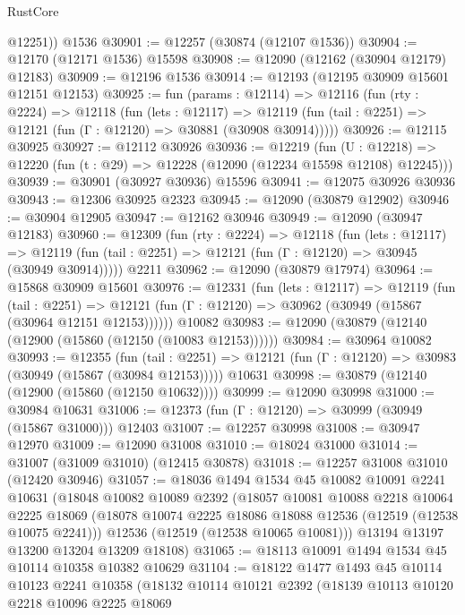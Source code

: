 \begin{lexlean}{RustCore}
\begin{coremodule}
        @12251))
    @1536
@30901 := @12257 (@30874 (@12107 @1536))
@30904 := @12170 (@12171 @1536) @15598
@30908 := @12090 (@12162 (@30904 @12179) @12183)
@30909 := @12196 @1536
@30914 := @12193 (@12195 @30909 @15601 @12151 @12153)
@30925 := fun (params : @12114) =>
  @12116
    (fun (rty : @2224) =>
    @12118
      (fun (lets : @12117) =>
      @12119 (fun (tail : @2251) => @12121 (fun (Γ : @12120) => @30881 (@30908 @30914)))))
@30926 := @12115 @30925
@30927 := @12112 @30926
@30936 := @12219
    (fun (U : @12218) => @12220 (fun (t : @29) => @12228 (@12090 (@12234 @15598 @12108) @12245)))
@30939 := @30901 (@30927 @30936) @15596
@30941 := @12075 @30926 @30936
@30943 := @12306 @30925 @2323
@30945 := @12090 (@30879 @12902)
@30946 := @30904 @12905
@30947 := @12162 @30946
@30949 := @12090 (@30947 @12183)
@30960 := @12309
    (fun (rty : @2224) =>
    @12118
      (fun (lets : @12117) =>
      @12119 (fun (tail : @2251) => @12121 (fun (Γ : @12120) => @30945 (@30949 @30914)))))
    @2211
@30962 := @12090 (@30879 @17974)
@30964 := @15868 @30909 @15601
@30976 := @12331
    (fun (lets : @12117) =>
    @12119
      (fun (tail : @2251) =>
      @12121 (fun (Γ : @12120) => @30962 (@30949 (@15867 (@30964 @12151 @12153))))))
    @10082
@30983 := @12090 (@30879 (@12140 (@12900 (@15860 (@12150 (@10083 @12153))))))
@30984 := @30964 @10082
@30993 := @12355
    (fun (tail : @2251) => @12121 (fun (Γ : @12120) => @30983 (@30949 (@15867 (@30984 @12153)))))
    @10631
@30998 := @30879 (@12140 (@12900 (@15860 (@12150 @10632))))
@30999 := @12090 @30998
@31000 := @30984 @10631
@31006 := @12373 (fun (Γ : @12120) => @30999 (@30949 (@15867 @31000))) @12403
@31007 := @12257 @30998
@31008 := @30947 @12970
@31009 := @12090 @31008
@31010 := @18024 @31000
@31014 := @31007 (@31009 @31010) (@12415 @30878)
@31018 := @12257 @31008 @31010 (@12420 @30946)
@31057 := @18036
    @1494
    @1534
    @45
    @10082
    @10091
    @2241
    @10631
    (@18048
      @10082
      @10089
      @2392
      (@18057
        @10081
        @10088
        @2218
        @10064
        @2225
        @18069
        (@18078 @10074 @2225 @18086 @18088 @12536 (@12519 (@12538 @10075 @2241)))
        @12536
        (@12519 (@12538 @10065 @10081)))
      @13194
      @13197
      @13200
      @13204
      @13209
      @18108)
@31065 := @18113 @10091 @1494 @1534 @45 @10114 @10358 @10382 @10629
@31104 := @18122
    @1477
    @1493
    @45
    @10114
    @10123
    @2241
    @10358
    (@18132
      @10114
      @10121
      @2392
      (@18139
        @10113
        @10120
        @2218
        @10096
        @2225
        @18069

\end{coremodule}
\end{lexlean}
